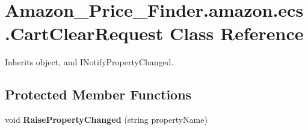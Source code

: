 \hypertarget{class_amazon___price___finder_1_1amazon_1_1ecs_1_1_cart_clear_request}{\section{Amazon\-\_\-\-Price\-\_\-\-Finder.\-amazon.\-ecs.\-Cart\-Clear\-Request Class Reference}
\label{class_amazon___price___finder_1_1amazon_1_1ecs_1_1_cart_clear_request}
}


 




Inherits object, and I\-Notify\-Property\-Changed.

\subsection*{Protected Member Functions}
\begin{DoxyCompactItemize}
\item 
\hypertarget{class_amazon___price___finder_1_1amazon_1_1ecs_1_1_cart_clear_request_aad660d91bea2e2c49326b0c1dc999110}{void {\bfseries Raise\-Property\-Changed} (string property\-Name)}\label{class_amazon___price___finder_1_1amazon_1_1ecs_1_1_cart_clear_request_aad660d91bea2e2c49326b0c1dc999110}

\end{DoxyCompactItemize}

